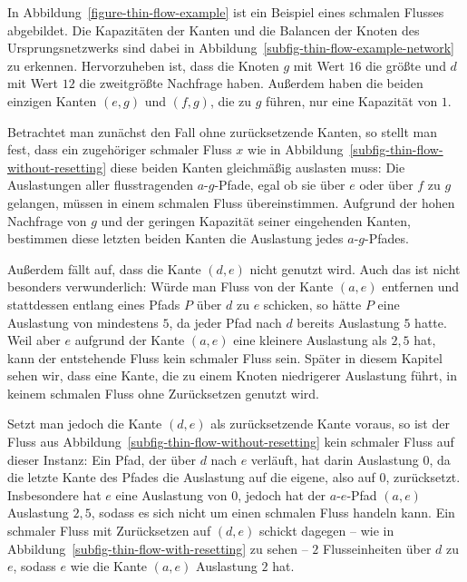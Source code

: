 \begin{example}
	In Abbildung~\ref{figure-thin-flow-example} ist ein Beispiel eines schmalen Flusses abgebildet.
	Die Kapazitäten der Kanten und die Balancen der Knoten des Ursprungsnetzwerks sind dabei in Abbildung~\ref{subfig-thin-flow-example-network} zu erkennen.
	Hervorzuheben ist, dass die Knoten $g$ mit Wert $16$ die größte und $d$ mit Wert $12$ die zweitgrößte Nachfrage haben.
	Außerdem haben die beiden einzigen Kanten $(e,g)$ und $(f,g)$, die zu $g$ führen, nur eine Kapazität von $1$.
	
	Betrachtet man zunächst den Fall ohne zurücksetzende Kanten, so stellt man fest, dass ein zugehöriger schmaler Fluss $x$ wie in Abbildung~\ref{subfig-thin-flow-without-resetting} diese beiden Kanten gleichmäßig auslasten muss:
	Die Auslastungen aller flusstragenden $a$-$g$-Pfade, egal ob sie über $e$ oder über $f$ zu $g$ gelangen, müssen in einem schmalen Fluss übereinstimmen.
	Aufgrund der hohen Nachfrage von $g$ und der geringen Kapazität seiner eingehenden Kanten, bestimmen diese letzten beiden Kanten die Auslastung jedes $a$-$g$-Pfades.
	
	Außerdem fällt auf, dass die Kante $(d,e)$ nicht genutzt wird.
	Auch das ist nicht besonders verwunderlich:
	Würde man Fluss von der Kante $(a, e)$ entfernen und stattdessen entlang eines Pfads $P$ über $d$ zu $e$ schicken, so hätte $P$ eine Auslastung von mindestens $5$, da jeder Pfad nach $d$ bereits Auslastung $5$ hatte.
	Weil aber $e$ aufgrund der Kante $(a,e)$ eine kleinere Auslastung als $2{,}5$ hat, kann der entstehende Fluss kein schmaler Fluss sein.
	Später in diesem Kapitel sehen wir, dass eine Kante, die zu einem Knoten niedrigerer Auslastung führt, in keinem schmalen Fluss ohne Zurücksetzen genutzt wird.
	
	Setzt man jedoch die Kante $(d, e)$ als zurücksetzende Kante voraus, so ist der Fluss aus Abbildung~\ref{subfig-thin-flow-without-resetting} kein schmaler Fluss auf dieser Instanz:
	Ein Pfad, der über $d$ nach $e$ verläuft, hat darin Auslastung $0$, da die letzte Kante des Pfades die Auslastung auf die eigene, also auf $0$, zurücksetzt.
	Insbesondere hat $e$ eine Auslastung von $0$, jedoch hat der $a$-$e$-Pfad $(a, e)$ Auslastung $2{,}5$, sodass es sich nicht um einen schmalen Fluss handeln kann.
	Ein schmaler Fluss mit Zurücksetzen auf $(d, e)$ schickt dagegen -- wie in Abbildung~\ref{subfig-thin-flow-with-resetting} zu sehen -- $2$ Flusseinheiten über $d$ zu $e$, sodass $e$ wie die Kante $(a,e)$ Auslastung $2$ hat.
\end{example}

